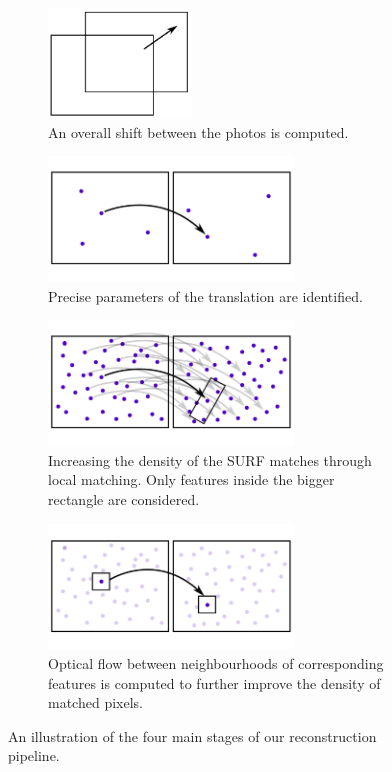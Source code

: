\vspace{0.5cm}
\begin{figure}[H]
\centering

\begin{subfigure}[b]{0.45\textwidth}
\centering
\includegraphics[width=3.8cm]{img/impl0.pdf}
\caption{An overall shift between the photos is computed.} \label{impl0}
\end{subfigure}
\hspace{0.5cm}
\begin{subfigure}[b]{0.45\textwidth}
\centering
\includegraphics[width=6.5cm]{img/impl1.pdf}
\caption{Precise parameters of the translation are identified.} \label{impl1}
\end{subfigure}
\begin{subfigure}[b]{0.45\textwidth}
\centering
\includegraphics[width=6.5cm]{img/impl2.pdf}
\caption{Increasing the density of the SURF matches through local matching. Only features inside the bigger rectangle are considered.} \label{impl2}
\end{subfigure}
\hspace{0.5cm}
\begin{subfigure}[b]{0.45\textwidth}
\centering
\includegraphics[width=6.5cm]{img/impl3.pdf}
\caption{Optical flow between neighbourhoods of corresponding features is computed to further improve the density of matched pixels.} \label{impl3}
\end{subfigure}

\caption[]{An illustration of the four main stages of our reconstruction pipeline.} 
\label{fig:impl}
\end{figure}
\vspace{0.5cm}

